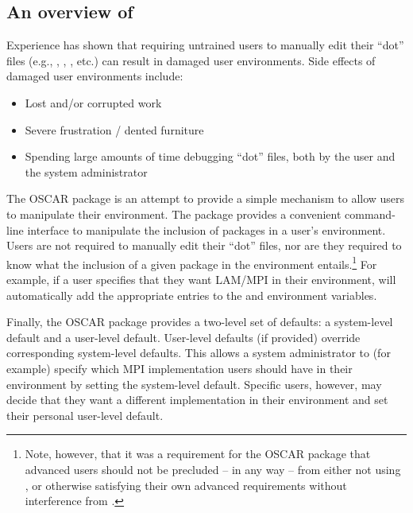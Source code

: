 %
%
%

\subsection{An overview of }
\label{app:switcher-overview}

Experience has shown that requiring untrained users to manually edit
their ``dot'' files (e.g., ,
, , etc.) can result in
damaged user environments.  Side effects of damaged user environments
include:

\begin{itemize}
\item Lost and/or corrupted work
\item Severe frustration / dented furniture
\item Spending large amounts of time debugging ``dot'' files, both by
  the user and the system administrator
\end{itemize}

The OSCAR  package is an attempt to provide a simple
mechanism to allow users to manipulate their environment.  The
 package provides a convenient command-line interface to
manipulate the inclusion of packages in a user's environment.  Users
are not required to manually edit their ``dot'' files, nor are they
required to know what the inclusion of a given package in the
environment entails.\footnote{Note, however, that it was a requirement
  for the OSCAR  package that advanced users should not
  be precluded -- in any way -- from either not using ,
  or otherwise satisfying their own advanced requirements without
  interference from .}  For example, if a user specifies
that they want LAM/MPI in their environment,  will
automatically add the appropriate entries to the  and
 environment variables.

Finally, the OSCAR  package provides a two-level set of
defaults: a system-level default and a user-level default.  User-level
defaults (if provided) override corresponding system-level defaults.
This allows a system administrator to (for example) specify which MPI
implementation users should have in their environment by setting the
system-level default.  Specific users, however, may decide that they
want a different implementation in their environment and set their
personal user-level default.

